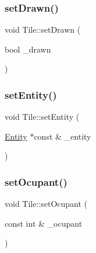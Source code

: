 \mbox{\label{class_tile_a04fb6595abd60793fafa1154849de12e}} 
\subsubsection{\texorpdfstring{set\+Drawn()}{setDrawn()}}
{\footnotesize\ttfamily void Tile\+::set\+Drawn (\begin{DoxyParamCaption}\item[{bool}]{\+\_\+drawn }\end{DoxyParamCaption})\hspace{0.3cm}{\ttfamily [inline]}}

\mbox{\label{class_tile_af84f312f41aac834deafeac923d61d44}} 
\subsubsection{\texorpdfstring{set\+Entity()}{setEntity()}}
{\footnotesize\ttfamily void Tile\+::set\+Entity (\begin{DoxyParamCaption}\item[{\hyperlink{class_entity}{Entity} $\ast$const \&}]{\+\_\+entity }\end{DoxyParamCaption})\hspace{0.3cm}{\ttfamily [inline]}}

\mbox{\label{class_tile_aa431348bc166683bbb6e66ec0fb3763b}} 
\subsubsection{\texorpdfstring{set\+Ocupant()}{setOcupant()}}
{\footnotesize\ttfamily void Tile\+::set\+Ocupant (\begin{DoxyParamCaption}\item[{const int \&}]{\+\_\+ocupant }\end{DoxyParamCaption})\hspace{0.3cm}{\ttfamily [inline]}}

\mbox{\label{class_tile_a6d696247c6c9c8d9db76ed446366edbe}} 
